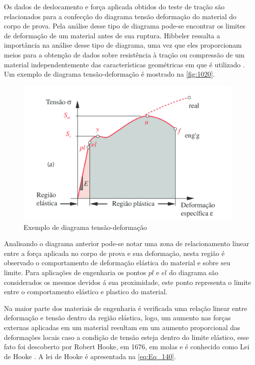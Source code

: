 Os dados de deslocamento e força aplicada obtidos do teste de tração são relacionados para a confecção do diagrama tensão deformação do material do corpo de prova.
Pela análise desse tipo de diagrama pode-se encontrar os limites de deformação de um material antes de sua ruptura.
Hibbeler ressalta a importância na análise desse tipo de diagrama, uma vez que eles proporcionam meios para a obtenção de dados sobre resistência à tração
ou compressão de um material independentemente das características geométricas em que é utilizado \autocite{Hibbeler2010}.
Um exemplo de diagrama tensão-deformação é mostrado na \autoref{fig:1020}.

\begin{figure}[htb]
	\caption{\label{fig:1020} Exemplo de diagrama tensão-deformação}
	\begin{center}
		\includegraphics[width=\textwidth]{pictures/1020.png}
	\end{center}
\end{figure}

Analisando o diagrama anterior pode-se notar uma zona de relacionamento linear entre a força aplicada no corpo de prova e sua deformação,
nesta região é observado o comportamento de deformação elástica do material e sobre seu limite.
Para aplicações de engenharia os pontos $pl$ e $el$ do diagrama são considerados os mesmos devidos á sua proximidade, este ponto representa
o limite entre o comportamento elástico e plastico do material. \autocite{Norton2011}

Na maior parte dos materiais de engenharia é verificada uma relação linear entre deformação e tensão dentro da região elástica, logo, um aumento
nas forças externas aplicadas em um material resultam em um aumento proporcional das deformações locais caso a condição de tensão esteja dentro
do limite elástico, esse fato foi descoberto por Robert Hooke, em 1676, em molas e é conhecido como Lei de Hooke \autocite{Hibbeler2010}.
A lei de Hooke é apresentada na \autoref{eq:Eq_140}.

